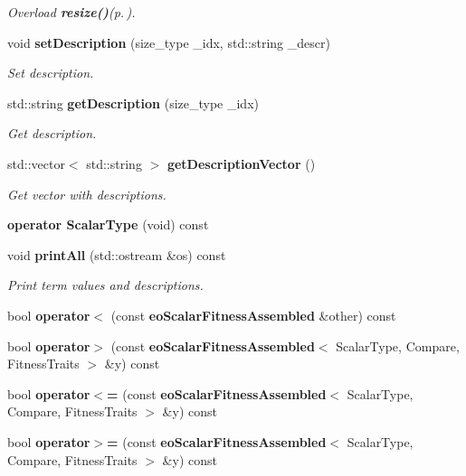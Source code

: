 \begin{CompactItemize}
\begin{CompactList}\small\item\em Overload {\bf resize()}{\rm (p.\,\pageref{classeo_scalar_fitness_assembled_a8})}. \item\end{CompactList}\item 
void {\bf set\-Description} (size\_\-type \_\-idx, std::string \_\-descr)\label{classeo_scalar_fitness_assembled_a9}

\begin{CompactList}\small\item\em Set description. \item\end{CompactList}\item 
std::string {\bf get\-Description} (size\_\-type \_\-idx)\label{classeo_scalar_fitness_assembled_a10}

\begin{CompactList}\small\item\em Get description. \item\end{CompactList}\item 
std::vector$<$ std::string $>$ {\bf get\-Description\-Vector} ()\label{classeo_scalar_fitness_assembled_a11}

\begin{CompactList}\small\item\em Get vector with descriptions. \item\end{CompactList}\item 
{\bf operator Scalar\-Type} (void) const \label{classeo_scalar_fitness_assembled_a12}

\item 
void {\bf print\-All} (std::ostream \&os) const \label{classeo_scalar_fitness_assembled_a13}

\begin{CompactList}\small\item\em Print term values and descriptions. \item\end{CompactList}\item 
bool {\bf operator$<$} (const {\bf eo\-Scalar\-Fitness\-Assembled} \&other) const \label{classeo_scalar_fitness_assembled_a14}

\item 
bool {\bf operator$>$} (const {\bf eo\-Scalar\-Fitness\-Assembled}$<$ Scalar\-Type, Compare, Fitness\-Traits $>$ \&y) const \label{classeo_scalar_fitness_assembled_a15}

\item 
bool {\bf operator$<$=} (const {\bf eo\-Scalar\-Fitness\-Assembled}$<$ Scalar\-Type, Compare, Fitness\-Traits $>$ \&y) const \label{classeo_scalar_fitness_assembled_a16}

\item 
bool {\bf operator$>$=} (const {\bf eo\-Scalar\-Fitness\-Assembled}$<$ Scalar\-Type, Compare, Fitness\-Traits $>$ \&y) const \label{classeo_scalar_fitness_assembled_a17}

\end{CompactItemize}
